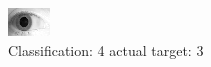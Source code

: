 \begin{figure}[h!]
\begin{center}
\includegraphics[width=0.60\columnwidth]{figures/ID1949_class_4_target_3.png}
\end{center}
\caption{ Classification: 4 actual target: 3}
\label{fig:ID1949_class_4_target_3}
\end{figure}
